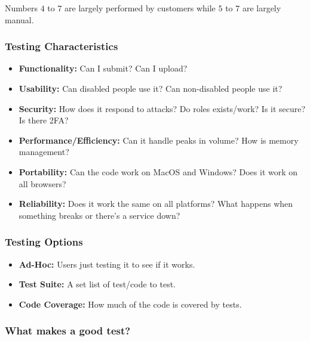 \begin{note}
	Numbers \(4\) to \(7\) are largely performed by customers while \(5\) to \(7\) are largely manual.
\end{note}

\subsubsection{Testing Characteristics}\label{ssub:testing_characteristics}

\begin{itemize}
	\item \textbf{Functionality:} Can I submit? Can I upload?
	\item \textbf{Usability:} Can disabled people use it? Can non-disabled people use it?
	\item \textbf{Security:} How does it respond to attacks? Do roles exists/work? Is it secure? Is there 2FA?
	\item \textbf{Performance/Efficiency:} Can it handle peaks in volume? How is memory management?
	\item \textbf{Portability:} Can the code work on MacOS and Windows? Does it work on all browsers?
	\item \textbf{Reliability:} Does it work the same on all platforms? What happens when something breaks or there's a service down?
\end{itemize}

\subsubsection{Testing Options}\label{ssub:testing_options}

\begin{itemize}
	\item \textbf{Ad-Hoc:} Users just testing it to see if it works.
	\item \textbf{Test Suite:} A set list of test/code to test.
	\item \textbf{Code Coverage:} How much of the code is covered by tests.
\end{itemize}

\subsubsection{What makes a good test?}\label{ssub:what_makes_a_good_test_}

